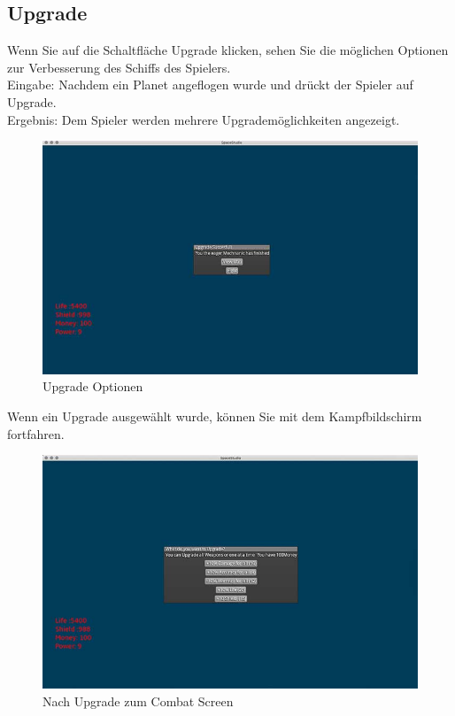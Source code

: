 \documentclass[12pt]{article}
\begin{document}
\subsection{Upgrade}
Wenn Sie auf die Schaltfläche Upgrade klicken, sehen Sie die möglichen Optionen zur Verbesserung des Schiffs des Spielers.\\
Eingabe: Nachdem ein Planet angeflogen wurde und drückt der Spieler auf Upgrade.\\
Ergebnis: Dem Spieler werden mehrere Upgrademöglichkeiten angezeigt.\\
\begin{figure}[htp]
\centering
\includegraphics[scale=0.6]{TestProtocolBilder/nachupgrade@0,25x.jpg}
\caption{Upgrade Optionen}
\end{figure}

Wenn ein Upgrade ausgewählt wurde, können Sie mit dem Kampfbildschirm fortfahren.
\begin{figure}[htp]
\centering
\includegraphics[scale=0.6]{TestProtocolBilder/upgrade@0,25x.jpg}
\caption{Nach Upgrade zum Combat Screen}
\end{figure}
\end{document}
